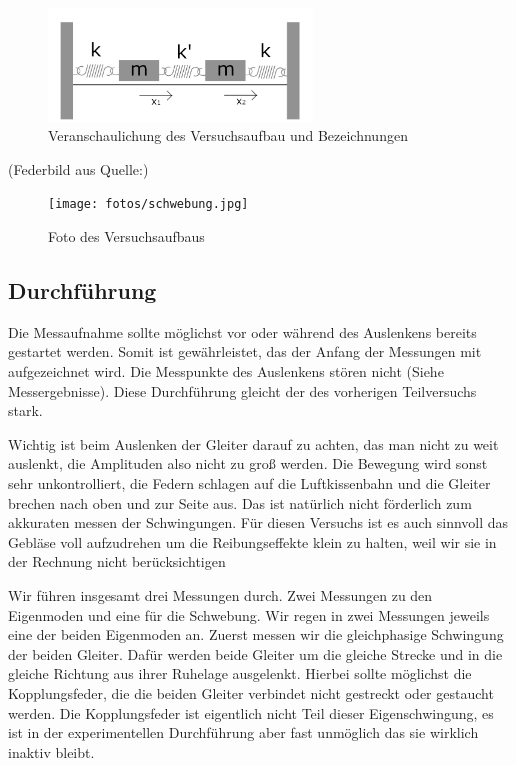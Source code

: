 \documentclass{article}
\begin{document}
          \begin{figure}[ht]\label{fig:gekoppelt}
              \centering
              \includegraphics[width=7cm]{fotos/gekoppelt.png}
              \caption{Veranschaulichung des Versuchsaufbau und Bezeichnungen}
          \end{figure}
          (Federbild aus Quelle:\cite{Federn})
          \begin{figure}[ht]\label{fig:foto_schwebung}
              \centering
              \texttt{[image: fotos/schwebung.jpg]}
              \caption{Foto des Versuchsaufbaus}
          \end{figure}

      \subsection{Durchführung}
          Die Messaufnahme sollte möglichst vor oder während des Auslenkens bereits gestartet werden.
          Somit ist gewährleistet, das der Anfang der Messungen mit aufgezeichnet wird. Die Messpunkte des Auslenkens stören nicht (Siehe Messergebnisse).
          Diese Durchführung gleicht der des vorherigen Teilversuchs stark.

          Wichtig ist beim Auslenken der Gleiter darauf zu achten, das man nicht zu weit auslenkt, die Amplituden also nicht zu groß werden.
          Die Bewegung wird sonst sehr unkontrolliert, die Federn schlagen auf die Luftkissenbahn und die Gleiter brechen nach oben und zur Seite aus.
          Das ist natürlich nicht förderlich zum akkuraten messen der Schwingungen.
          Für diesen Versuchs ist es auch sinnvoll das Gebläse voll aufzudrehen um die Reibungseffekte klein zu halten, weil wir sie in der Rechnung nicht berücksichtigen

          Wir führen insgesamt drei Messungen durch. Zwei Messungen zu den Eigenmoden und eine für die Schwebung.
          Wir regen in zwei Messungen jeweils eine der beiden Eigenmoden an.
          Zuerst messen wir die gleichphasige Schwingung der beiden Gleiter.
          Dafür werden beide Gleiter um die gleiche Strecke und in die gleiche Richtung aus ihrer Ruhelage ausgelenkt.
          Hierbei sollte möglichst die Kopplungsfeder, die die beiden Gleiter verbindet nicht gestreckt oder gestaucht werden.
          Die Kopplungsfeder ist eigentlich nicht Teil dieser Eigenschwingung,
          es ist in der experimentellen Durchführung aber fast unmöglich das sie wirklich inaktiv bleibt.
\end{document}
